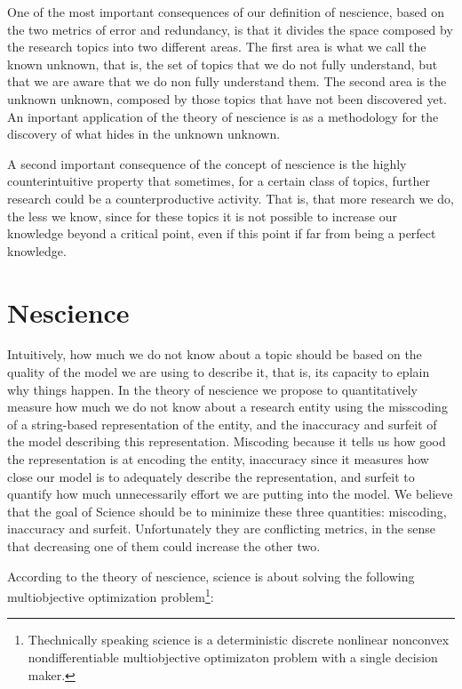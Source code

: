 One of the most important consequences of our definition of nescience, based on the two metrics of error and redundancy, is that it divides the space composed by the research topics into two different areas. The first area is what we call the known unknown, that is, the set of topics that we do not fully understand, but that we are aware that we do non fully understand them. The second area is the unknown unknown, composed by those topics that have not been discovered yet. An inportant application of the theory of nescience is as a methodology for the discovery of what hides in the unknown unknown.

A second important consequence of the concept of nescience is the highly counterintuitive property that sometimes, for a certain class of topics, further research could be a counterproductive activity. That is, that more research we do, the less we know, since for these topics it is not possible to increase our knowledge beyond a critical point, even if this point if far from being a perfect knowledge.

%
%

\section{Nescience}

Intuitively, how much we do not know about a topic should be based on the quality of the model we are using to describe it, that is, its capacity to eplain why things happen. In the theory of nescience we propose to quantitatively measure how much we do not know about a research entity using the misscoding of a string-based representation of the entity, and the inaccuracy and surfeit of the model describing this representation. Miscoding because it tells us how good the representation is at encoding the entity, inaccuracy since it measures how close our model is to adequately describe the representation, and surfeit to quantify how much unnecessarily effort we are putting into the model. We believe that the goal of Science should be to minimize these three quantities: miscoding, inaccuracy and surfeit. Unfortunately they are conflicting metrics, in the sense that decreasing one of them could increase the other two.

According to the theory of nescience, science is about solving the following multiobjective optimization problem\footnote{Thechnically speaking science is a deterministic discrete nonlinear nonconvex nondifferentiable multiobjective optimizaton problem with a single decision maker.}:

